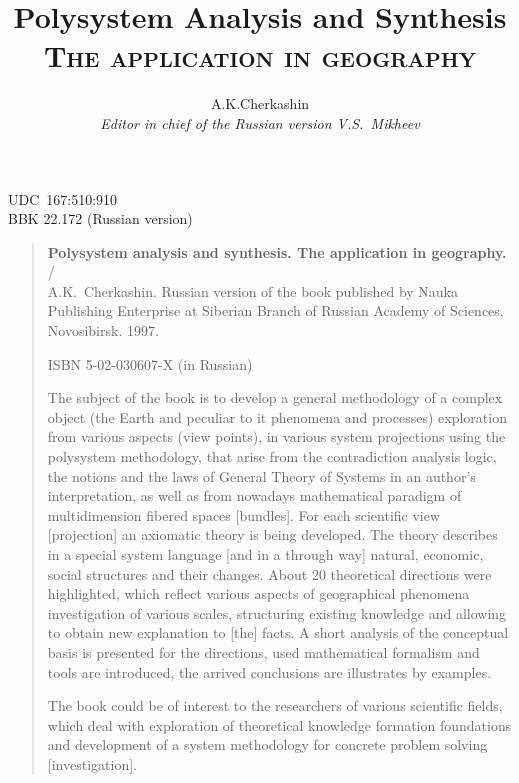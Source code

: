 \documentclass[12pt,leqno]{book}
\title{Polysystem Analysis and Synthesis\\\textsc{\small{} The application in geography}  }
\author{A.K.Cherkashin  \\
{\small\em Editor in chief of the Russian version V.S.~Mikheev }}
\date{ }
\begin{document}
\maketitle
\tableofcontents
\newpage{}
\pagestyle{empty}
\noindent{}UDC~167:510:910\\{}
BBK 22.172 (Russian version)
\vfill
\begin{quote}
\small{}
\textbf{Polysystem analysis and synthesis. The application in geography.} /\\{}
A.K.~Cherkashin. Russian version of the book published by Nauka Publishing Enterprise at Siberian Branch of Russian Academy of Sciences, Novosibirsk. 1997.

ISBN 5-02-030607-X (in Russian)

The subject of the book is to develop a general methodology of a complex object (the Earth and peculiar to it phenomena and processes) exploration from various aspects (view points), in various system projections using the polysystem methodology, that arise from the contradiction analysis logic, the notions and the laws of General Theory of Systems in an author's interpretation, as well as from nowadays mathematical paradigm of multidimension fibered spaces [bundles]. For each scientific view [projection] an axiomatic theory is being developed. The theory describes in a special system language [and in a through way] natural, economic, social structures and their changes. About 20 theoretical directions were highlighted, which reflect various aspects of geographical phenomena investigation of various scales, structuring existing knowledge and allowing to obtain new explanation to [the] facts. A short analysis of the conceptual basis is presented for the directions, used mathematical formalism and tools are introduced, the arrived conclusions are illustrates by examples.

The book could be of interest to the researchers of various scientific fields, which deal with exploration of theoretical knowledge formation foundations and development of a system methodology for concrete problem solving [investigation].

\vspace{1em}


\end{quote}
\end{document}
